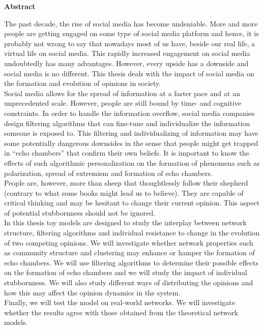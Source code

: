 \documentclass[11 pt , letterpaper , twoside , openright]{book}
\newenvironment{abstract}%
{\cleardoublepage\null \vfill\begin{center}\bfseries \abstractname \end{center}}{\vfill\null}
\begin{document}
\renewcommand{\abstractname}{Abstract}
\begin{abstract}
\thispagestyle{plain}
\setcounter{page}{\value{abstractpage}}

\noindent
The past decade, the rise of social media has become undeniable. More and more people are getting engaged on some type of social media platform and hence, it is probably not wrong to say that nowadays most of us have, beside our real life, a virtual life on social media. This rapidly increased engagement on social media undoubtedly has many advantages. However, every upside has a downside and social media is no different. This thesis deals with the impact of social media on the formation and evolution of opinions in society.\\ 
\newline
Social media allows for the spread of information at a faster pace and at an unprecedented scale. However, people are still bound by time- and cognitive constraints. In order to handle the information overflow, social media companies design filtering algorithms that can fine-tune and individualize the information someone is exposed to. This filtering and individualizing of information may have some potentially dangerous downsides in the sense that people might get trapped in ``echo chambers'' that confirm their own beliefs. It is important to know the effects of such algorithmic personalization on the formation of phenomena such as polarization, spread of extremism and formation of echo chambers.\\
\newline
People are, however, more than sheep that thoughtlessly follow their shepherd (contrary to what some books might lead us to believe). They are capable of critical thinking and may be hesitant to change their current opinion. This aspect of potential stubbornness should not be ignored.\\
\newline
In this thesis toy models are designed to study the interplay between network structure, filtering algorithms and individual resistance to change in the evolution of two competing opinions. We will investigate whether network properties such as community structure and clustering may enhance or hamper the formation of echo chambers. We will use filtering algorithms to determine their possible effects on the formation of echo chambers and we will study the impact of individual stubbornness. We will also study different ways of distributing the opinions and how this may affect the opinion dynamics in the system. \\
\newline
Finally, we will test the model on real-world networks. We will investigate whether the results agree with those obtained from the theoretical network models.

\setcounter{abstractpage}{\value{page}}
\end{abstract}
\end{document}

